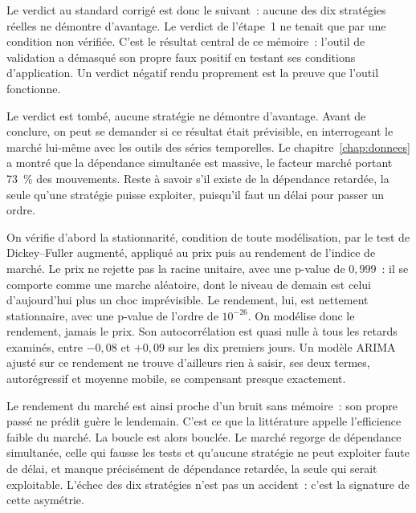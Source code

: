 Le verdict au standard corrigé est donc le suivant~: aucune des dix
stratégies réelles ne démontre d'avantage. Le verdict de l'étape~1 ne
tenait que par une condition non vérifiée. C'est le résultat central de
ce mémoire~: l'outil de validation a démasqué son propre faux positif en
testant ses conditions d'application. Un verdict négatif rendu
proprement est la preuve que l'outil fonctionne.


Le verdict est tombé, aucune stratégie ne démontre d'avantage. Avant de
conclure, on peut se demander si ce résultat était prévisible, en
interrogeant le marché lui-même avec les outils des séries temporelles.
Le chapitre~\ref{chap:donnees} a montré que la dépendance simultanée est
massive, le facteur marché portant 73~\% des mouvements. Reste à savoir
s'il existe de la dépendance retardée, la seule qu'une stratégie puisse
exploiter, puisqu'il faut un délai pour passer un ordre.

On vérifie d'abord la stationnarité, condition de toute modélisation,
par le test de Dickey--Fuller augmenté, appliqué au prix puis au
rendement de l'indice de marché. Le prix ne rejette pas la racine
unitaire, avec une p-value de $0{,}999$~: il se comporte comme une
marche aléatoire, dont le niveau de demain est celui d'aujourd'hui plus
un choc imprévisible. Le rendement, lui, est nettement stationnaire,
avec une p-value de l'ordre de $10^{-26}$. On modélise donc le
rendement, jamais le prix. Son autocorrélation est quasi nulle à tous
les retards examinés, entre $-0{,}08$ et $+0{,}09$ sur les dix premiers
jours. Un modèle ARIMA~\cite{boxjenkins1970} ajusté sur ce rendement ne
trouve d'ailleurs rien à saisir, ses deux termes, autorégressif et
moyenne mobile, se compensant presque exactement.

Le rendement du marché est ainsi proche d'un bruit sans mémoire~: son
propre passé ne prédit guère le lendemain. C'est ce que la littérature
appelle l'efficience faible du marché. La boucle est alors bouclée. Le
marché regorge de dépendance simultanée, celle qui fausse les tests et
qu'aucune stratégie ne peut exploiter faute de délai, et manque
précisément de dépendance retardée, la seule qui serait exploitable.
L'échec des dix stratégies n'est pas un accident~: c'est la signature de
cette asymétrie.



